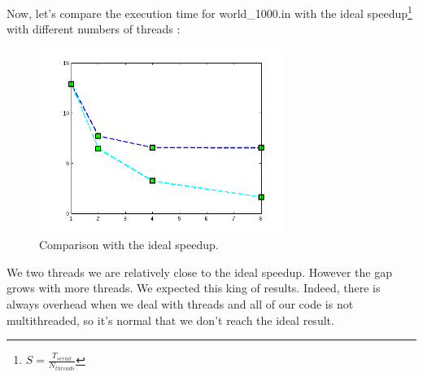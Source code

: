 \documentclass[a4paper,10pt]{article}
\begin{document}
Now, let's compare the execution time for  world\_1000.in with the ideal speedup\footnote{$S = \frac{T_{serial}}{N_{threads}}$}
with different numbers of threads :

\begin{figure}[!ht]
  \centering
  \includegraphics[width=8cm]{speedup.png}
  \caption{Comparison with the ideal speedup.}
\end{figure} 

We two threads we are relatively close to the ideal speedup. However the gap grows with more threads. We expected this king of results.
Indeed, there is always overhead when we deal with threads and all of our code is not multithreaded, so it's normal that we don't reach
the ideal result.
\end{document}
